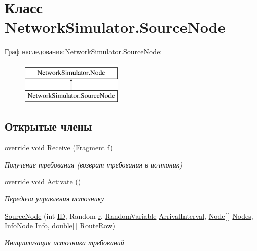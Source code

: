 \hypertarget{class_network_simulator_1_1_source_node}{}\section{Класс Network\+Simulator.\+Source\+Node}
\label{class_network_simulator_1_1_source_node}
Граф наследования\+:Network\+Simulator.\+Source\+Node\+:\begin{figure}[H]
\begin{center}
\leavevmode
\includegraphics[height=2.000000cm]{class_network_simulator_1_1_source_node}
\end{center}
\end{figure}
\subsection*{Открытые члены}
\begin{DoxyCompactItemize}
\item 
override void \hyperlink{class_network_simulator_1_1_source_node_acb023c692466b3434dd8c1b0bd481e1b}{Receive} (\hyperlink{class_network_simulator_1_1_fragment}{Fragment} f)
\begin{DoxyCompactList}\small\item\em Получение требования (возврат требования в исчтоник) \end{DoxyCompactList}\item 
override void \hyperlink{class_network_simulator_1_1_source_node_ac57d1b9f996720128fc9c5ec08bf95da}{Activate} ()
\begin{DoxyCompactList}\small\item\em Передача управления источнику \end{DoxyCompactList}\item 
\hyperlink{class_network_simulator_1_1_source_node_aa02f3786e6e62f1db4e44ef21605161b}{Source\+Node} (int \hyperlink{class_network_simulator_1_1_node_a1ba068212f50babe026c527a9b5fb55a}{ID}, Random \hyperlink{class_network_simulator_1_1_node_a3eb74310ed895ee8ec49c1850c1c405e}{r}, \hyperlink{class_random_variables_1_1_random_variable}{Random\+Variable} \hyperlink{class_network_simulator_1_1_source_node_a9da60399e7ba58e5eea72a57acf69b8e}{Arrival\+Interval}, \hyperlink{class_network_simulator_1_1_node}{Node}\mbox{[}$\,$\mbox{]} \hyperlink{class_network_simulator_1_1_node_abae5930cce02aa93551aefe417b23fa0}{Nodes}, \hyperlink{class_network_simulator_1_1_info_node}{Info\+Node} \hyperlink{class_network_simulator_1_1_node_a63e706d7158c6ea84ea8fdbe61d9bffb}{Info}, double\mbox{[}$\,$\mbox{]} \hyperlink{class_network_simulator_1_1_source_node_aa06f15bdfd1627ca01d35acb9bae863b}{Route\+Row})
\begin{DoxyCompactList}\small\item\em Инициализация источника требований \end{DoxyCompactList}\end{DoxyCompactItemize}
